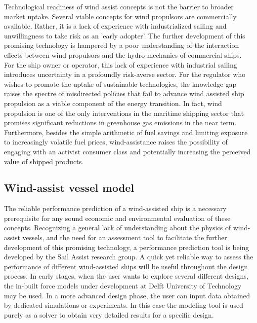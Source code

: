 \documentclass[twoside,twocolumn]{article}
\begin{document}
Technological readiness of wind assist concepts is not the barrier to broader market uptake. Several viable concepts for wind propulsors are commercially available. Rather, it is a lack of experience with industrialized sailing and unwillingness to take risk as an 'early adopter'. The further development of this promising technology is hampered by a poor understanding of  the interaction effects between wind propulsors and the hydro-mechanics of commercial ships. For the ship owner or operator, this lack of experience with industrial sailing introduces uncertainty in a profoundly risk-averse sector. For the regulator who wishes to promote the uptake of sustainable technologies, the knowledge gap raises the spectre of misdirected policies that fail to advance wind assisted ship propulsion as a viable component of the energy transition. In fact, wind propulsion is one of the only interventions in the maritime shipping sector that promises significant reductions in greenhouse gas emissions in the near term. Furthermore, besides the simple arithmetic of fuel savings and limiting exposure to increasingly volatile fuel prices, wind-assistance raises the possibility of engaging with an activist consumer class and potentially increasing the perceived value of shipped products.

\subsection{Wind-assist vessel model}
The reliable performance prediction of a wind-assisted ship is a necessary prerequisite for any sound economic and environmental evaluation of these concepts. Recognizing a general lack of understanding about the physics of wind-assist vessels, and the need for an assessment tool to facilitate the further development of this promising technology, a performance prediction tool is being developed by the Sail Assist research group. A quick yet reliable way to assess the performance of different wind-assisted ships will be useful throughout the design process. In early stages, when the user wants to explore several different designs, the in-built force models under development at Delft University of Technology may be used. In a more advanced design phase, the user can input data obtained by dedicated simulations or experiments. In this case the modeling tool is used purely as a solver to obtain very detailed results for a specific design.

\end{document}
